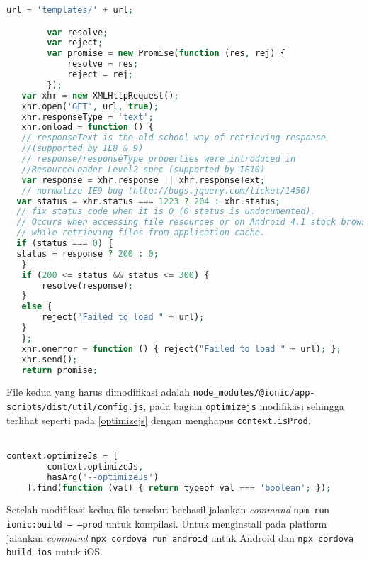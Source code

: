 \begin{lstlisting}[frame=single, label={lst:noresourceloaderreplace}, language=PHP, caption=Kode pengganti untuk fungsi \texttt{get}]
url = 'templates/' + url;

        var resolve;
        var reject;
        var promise = new Promise(function (res, rej) {
            resolve = res;
            reject = rej;
        });
   var xhr = new XMLHttpRequest();
   xhr.open('GET', url, true);
   xhr.responseType = 'text';
   xhr.onload = function () {
   // responseText is the old-school way of retrieving response 
   //(supported by IE8 & 9)
   // response/responseType properties were introduced in 
   //ResourceLoader Level2 spec (supported by IE10)
   var response = xhr.response || xhr.responseText;
   // normalize IE9 bug (http://bugs.jquery.com/ticket/1450)
  var status = xhr.status === 1223 ? 204 : xhr.status;
  // fix status code when it is 0 (0 status is undocumented).
  // Occurs when accessing file resources or on Android 4.1 stock browser
  // while retrieving files from application cache.
  if (status === 0) {
  status = response ? 200 : 0;
   }
   if (200 <= status && status <= 300) {
       resolve(response);
   }
   else {
       reject("Failed to load " + url);
   }
   };
   xhr.onerror = function () { reject("Failed to load " + url); };
   xhr.send();
   return promise;
\end{lstlisting}

File kedua yang harus dimodifikasi adalah \texttt{node\_modules/@ionic/app-scripts/dist/util/config.js}, pada bagian \texttt{optimizejs} modifikasi sehingga terlihat seperti pada \mbox{\ref{optimizejs}} dengan menghapus \texttt{context.isProd}.
\\
\\

\begin{lstlisting}[frame=single, label={optimizejs}, language=PHP, caption= \texttt{optimizejs} setelah modifikasi]
context.optimizeJs = [
        context.optimizeJs,
        hasArg('--optimizeJs')
    ].find(function (val) { return typeof val === 'boolean'; });
\end{lstlisting}
Setelah modifikasi kedua file tersebut berhasil jalankan \textit{command} \texttt{npm run ionic:build -- --prod} untuk kompilasi. Untuk menginstall pada platform jalankan \textit{command} \texttt{npx cordova run android} untuk Android dan \texttt{npx cordova build ios} untuk iOS.
